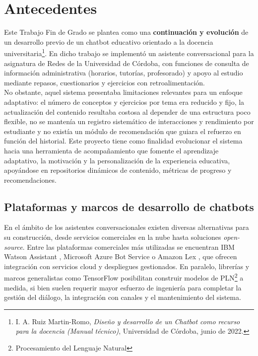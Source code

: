 \documentclass[a4paper,12pt,twoside,final]{book}
\begin{document}
\chapter{Antecedentes}
\label{cap:antecedentes}

Este Trabajo Fin de Grado se plantea como una \textbf{continuación y evolución} de un desarrollo previo de un chatbot educativo orientado a la docencia universitaria\footnote{I. A. Ruiz Martin-Romo, \textit{Diseño y desarrollo de un Chatbot como recurso para la docencia (Manual técnico)}, Universidad de Córdoba, junio de 2022.}. En dicho trabajo se implementó un asistente conversacional para la asignatura de Redes de la Universidad de Córdoba, con funciones de consulta de información administrativa (horarios, tutorías, profesorado) y apoyo al estudio mediante repasos, cuestionarios y ejercicios con retroalimentación.\\

No obstante, aquel sistema presentaba limitaciones relevantes para un enfoque adaptativo: el número de conceptos y ejercicios por tema era reducido y fijo, la actualización del contenido resultaba costosa al depender de una estructura poco flexible, no se mantenía un registro sistemático de interacciones y rendimiento por estudiante y no existía un módulo de recomendación que guiara el refuerzo en función del historial. Este proyecto tiene como finalidad evolucionar el sistema hacia una herramienta de acompañamiento que fomente el aprendizaje adaptativo, la motivación y la personalización de la experiencia educativa, apoyándose en repositorios dinámicos de contenido, métricas de progreso y recomendaciones.\\

\section{Plataformas y marcos de desarrollo de chatbots}
\label{sec:plataformas}

En el ámbito de los asistentes conversacionales existen diversas alternativas para su construcción, desde servicios comerciales en la nube hasta soluciones \textit{open-source}. Entre las plataformas comerciales más utilizadas se encuentran IBM Watson Assistant \cite{ibmWatsonAssistant}, Microsoft Azure Bot Service \cite{azureBotService} o Amazon Lex \cite{amazonLex}, que ofrecen integración con servicios cloud y despliegues gestionados. En paralelo, librerías y marcos generalistas como TensorFlow \cite{tensorflow} posibilitan construir modelos de PLN\footnote{Procesamiento del Lenguaje Natural} a medida, si bien suelen requerir mayor esfuerzo de ingeniería para completar la gestión del diálogo, la integración con canales y el mantenimiento del sistema. \\
\end{document}
